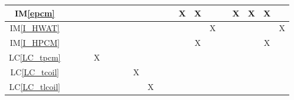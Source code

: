 \documentclass[12pt]{article}
\newcommand{\iref}[1]{IM\ref{#1}}
\newcommand{\lcref}[1]{LC\ref{#1}}
\begin{document}
{\begin{landscape}
\begin{table}[h!]
\begin{tabular}{|c|c|c|c|c|c|c|c|c|c|c|c|c|c|c|c|c|c|c|c|}
                \iref{epcm}         &                            &                 &                &               &                        &                  &                    &                &                 &                   &                 & X                 & X                   &                  &                & X                 & X             & X                  &                   \\ \hline
                \iref{I_HWAT}       &                            &                 &                &               &                        &                  &                    &                &                 &                   &                 &                   &                     & X                &                &                   &               &                    & X                 \\ \hline
                \iref{I_HPCM}       &                            &                 &                &               &                        &                  &                    &                &                 &                   &                 &                   & X                   &                  &                &                   &               & X                  &                   \\ \hline
                \lcref{LC_tpcm}     &                            &                 &                & X             &                        &                  &                    &                &                 &                   &                 &                   &                     &                  &                &                   &               &                    &                   \\ \hline
                \lcref{LC_tcoil}    &                            &                 &                &               &                        &                  &                    & X              &                 &                   &                 &                   &                     &                  &                &                   &               &                    &                   \\ \hline
                \lcref{LC_tlcoil}   &                            &                 &                &               &                        &                  &                    &                & X               &                   &                 &                   &                     &                  &                &                   &               &                    &                   \\ \hline

\end{tabular}
\end{table}
\end{landscape}}
\end{document}
